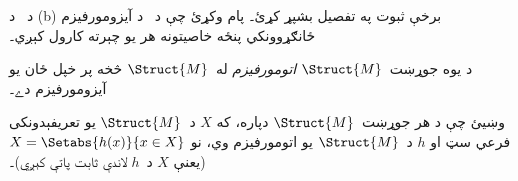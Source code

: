 \documentclass[../../../include/open-logic-section]{subfiles}
\begin{document}
\begin{prob}
د~ د (b) برخې ثبوت په تفصيل بشپړ
کړئ۔ پام وکړئ چې د~ د
آيزومورفيزم ځانګړوونکي پنځه خاصيتونه هر يو چېرته کارول کېږي۔
\end{prob}

\begin{defn}
د يوه جوړښت~$\Struct{M}$ \emph{اتومورفيزم} له~$\Struct{M}$ څخه پر
خپل ځان يو آيزومورفيزم دے۔
\end{defn}

\begin{prob}
وښيئ چې د هر جوړښت~$\Struct{M}$ دپاره، که $X$ د~$\Struct{M}$ يو
تعريفېدونکی فرعي سټ او $h$ د~$\Struct{M}$ يو اتومورفيزم وي، نو
$X = \Setabs{h(x)}{x \in X}$ (يعنې $X$ د~$h$ لاندې ثابت پاتې کېږي)۔
\end{prob}
\end{document}
